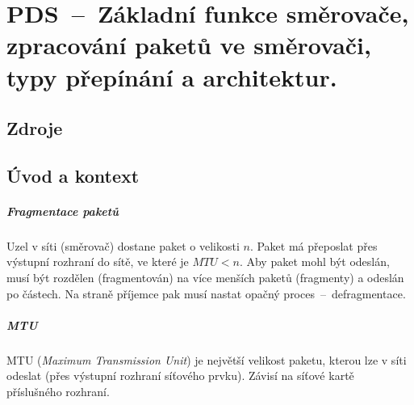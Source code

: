 

\graphicspath{{pds/smerovace/figures}}


\chapter{PDS~--~Základní funkce směrovače, zpracování paketů ve směrovači, typy přepínání a architektur.}


\section{Zdroje}

\begin{compactitem}
    \item {}
    \item {}
\end{compactitem}


\section{Úvod a kontext}


\paragraph*{Fragmentace paketů} Uzel v síti (směrovač) dostane paket o velikosti $n$. Paket má přeposlat přes výstupní rozhraní do sítě, ve které je $MTU < n$. Aby paket mohl být odeslán, musí být rozdělen (fragmentován) na více menších paketů (fragmenty) a odeslán po částech. Na straně příjemce pak musí nastat opačný proces~--~defragmentace.

\paragraph*{MTU} MTU (\textit{Maximum Transmission Unit}) je největší velikost paketu, kterou lze v síti odeslat (přes výstupní rozhraní síťového prvku). Závisí na síťové kartě příslušného rozhraní.

